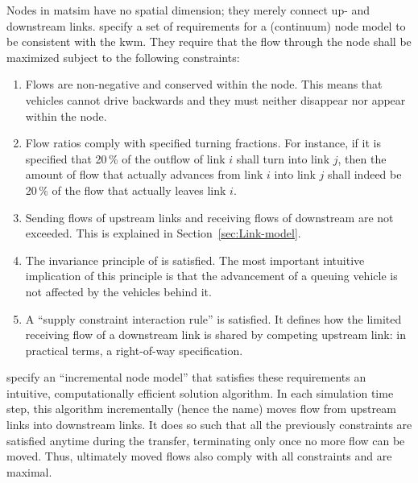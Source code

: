 Nodes in \gls{matsim} have no spatial dimension; they merely connect up- and
downstream links. \citet{tampere-2010b} specify a set of requirements for a
(continuum) node model to be consistent with the \gls{kwm}. They require that
the flow through the node shall be maximized subject to the following
constraints:
\begin{enumerate}
\item Flows are non-negative and conserved within the node. This means that
vehicles cannot drive backwards and they must neither disappear nor
appear within the node.
\item Flow ratios comply with  specified turning
fractions.
For instance, if it is specified that 20\,\% of the outflow of link
$i$ shall turn into link $j$, then the amount of flow that actually
advances from link $i$ into link $j$ shall indeed be 20\,\%
of the flow that actually leaves link $i$.
\item Sending flows of upstream links and receiving flows of downstream
 are not exceeded. This is explained in
Section~\ref{sec:Link-model}.
\item The invariance principle of \citet{lebacque-2005} is satisfied. The
most important intuitive implication of this principle is that the
advancement of a queuing vehicle is not affected by the vehicles
behind it.
\item A {}``supply constraint interaction rule'' is satisfied. It defines
how the limited receiving flow of a downstream link is shared
by  competing upstream link: in practical terms, a
right-of-way specification.
\end{enumerate}
\citet{floetteroed-2011a} specify an {}``incremental node model''
that satisfies these requirements an
intuitive, computationally efficient solution algorithm. In each simulation
time step, this algorithm incrementally (hence the name) moves flow
from upstream links into downstream links. It does so such that all
the previously  constraints are satisfied anytime during the
transfer, terminating only once no more flow can be moved. 
Thus,  ultimately moved flows also comply with all constraints
and are maximal. 

